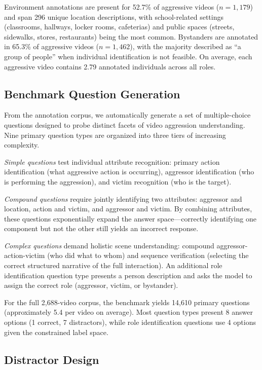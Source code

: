 \documentclass{article}
\begin{document}
Environment annotations are present for 52.7\% of aggressive videos ($n = 1,179$) and span 296 unique location descriptions, with school-related settings (classrooms, hallways, locker rooms, cafeterias) and public spaces (streets, sidewalks, stores, restaurants) being the most common.
Bystanders are annotated in 65.3\% of aggressive videos ($n = 1,462$), with the majority described as ``a group of people'' when individual identification is not feasible.
On average, each aggressive video contains 2.79 annotated individuals across all roles.

\subsection{Benchmark Question Generation}

From the annotation corpus, we automatically generate a set of multiple-choice questions designed to probe distinct facets of video aggression understanding.
Nine primary question types are organized into three tiers of increasing complexity.

\textit{Simple questions} test individual attribute recognition: primary action identification (what aggressive action is occurring), aggressor identification (who is performing the aggression), and victim recognition (who is the target).

\textit{Compound questions} require jointly identifying two attributes: aggressor and location, action and victim, and aggressor and victim.
By combining attributes, these questions exponentially expand the answer space---correctly identifying one component but not the other still yields an incorrect response.

\textit{Complex questions} demand holistic scene understanding: compound aggressor-action-victim (who did what to whom) and sequence verification (selecting the correct structured narrative of the full interaction).
An additional role identification question type presents a person description and asks the model to assign the correct role (aggressor, victim, or bystander).

For the full 2,688-video corpus, the benchmark yields 14,610 primary questions (approximately 5.4 per video on average).
Most question types present 8 answer options (1 correct, 7 distractors), while role identification questions use 4 options given the constrained label space.

\subsection{Distractor Design}
\end{document}
